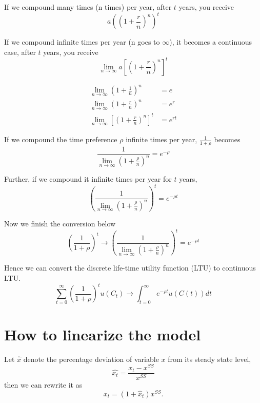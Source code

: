 \documentclass[12pt]{article}
\begin{document}
If we compound many times (n times) per year, after $ t $ years, you receive
\begin{equation*}
a \left( (1 + \frac{r}{n})^{n} \right) ^{t}
\end{equation*}

If we compound infinite times per year (n goes to $ \infty  $), it becomes a continuous
case, after $ t $ years, you receive
\begin{equation*}
\lim_{n \to \infty} a \left[  \left( 1 + \frac{r}{n} \right)^{n}  \right] ^{t}
\end{equation*}


\begin{align*}
\lim_{n \to \infty} \left( 1 + \frac{1}{n} \right) ^{n} &= e\\
\lim_{n \to \infty} \left( 1 + \frac{r}{n} \right) ^{n} &= e^{r}\\
\lim_{n \to \infty} \left[ \left( 1 + \frac{r}{n} \right)^{n}  \right] ^{t}&= e^{r t}
\end{align*}

If we compound the time preference $ \rho $ infinite times per year,
$ \frac{1}{1 + \rho} $
becomes
\begin{equation*}
 \frac{1}{ \lim_{n \to \infty}\left( 1 + \frac{\rho}{n} \right) ^{n}} = e^{-\rho}
\end{equation*}

Further, if we compound it infinite times per year for $ t $ years,
\begin{equation*}
\left(  \frac{1}{ \lim_{n \to \infty}\left( 1 + \frac{\rho}{n} \right) ^{n}}  \right) 
^{t} = e^{ - \rho t}
\end{equation*}

Now we finish the conversion below
\begin{equation*}
 \left( \frac{1}{1 + \rho} \right) ^{t}	
\rightarrow 
\left(  \frac{1}{ \lim_{n \to \infty}\left( 1 + \frac{\rho}{n} \right) ^{n}}  \right) 
^{t} = e^{ - \rho t}
\end{equation*}


Hence we can convert the discrete life-time utility function (LTU) to continuous LTU.
\begin{equation*}
\sum\limits_{t = 0} ^\infty \left( \frac{1}{1 + \rho} \right) ^{t} u(C_{t})
\rightarrow
\int_{t = 0}^{\infty } e^{ - \rho t}u(C(t))dt
\end{equation*}



\section{How to linearize the model}
Let $  \widehat{x} $ denote the percentage deviation of variable $ x $ from its
steady state level,
\begin{equation*}
 \widehat{x_{t}} = \frac{x_{t} - x^{SS	}}{x^{SS}}
\end{equation*}
then we can rewrite it as
\begin{equation*}
x_{t} = (1 +  \widehat{x}_{t})x^{SS}.
\end{equation*}
\end{document}
